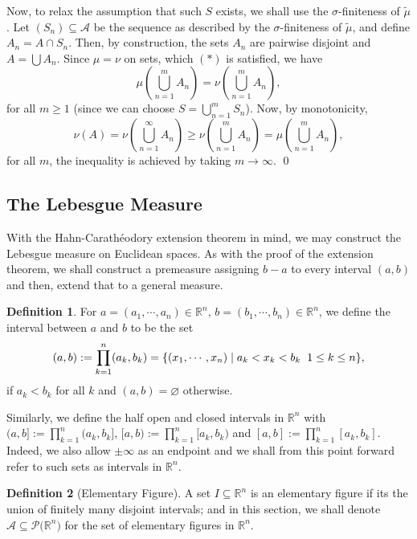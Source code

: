 \documentclass[
]{article}
\theoremstyle{definition}
\theoremstyle{definition}
\newtheorem{definition}{Definition}[section]
\begin{document}
Now, to relax the assumption that such \(S\) exists, we shall use the
\(\sigma\)-finiteness of \(\tilde{\mu}\). Let
\((S_n) \subseteq \mathcal{A}\) be the sequence as described by the
\(\sigma\)-finiteness of \(\tilde{\mu}\), and define
\(A_n = A \cap S_n\). Then, by construction, the sets \(A_n\) are
pairwise disjoint and \(A = \bigcup A_n\). Since \(\mu = \nu\) on sets,
which \((*)\) is satisfied, we have
\[\mu\left(\bigcup_{n = 1}^m A_n\right) = \nu\left(\bigcup_{n = 1}^m A_n\right),\]
for all \(m \ge 1\) (since we can choose \(S = \bigcup_{n = 1}^m S_n\)).
Now, by monotonicity,
\[\nu(A) = \nu\left(\bigcup_{n = 1}^\infty A_n\right) \ge \nu\left(\bigcup_{n = 1}^m A_n\right)
    = \mu\left(\bigcup_{n = 1}^m A_n\right),\] for all \(m\), the
inequality is achieved by taking \(m \to \infty\). \qed

\hypertarget{the-lebesgue-measure}{%
\subsection{The Lebesgue Measure}\label{the-lebesgue-measure}}

With the Hahn-Carathéodory extension theorem in mind, we may construct
the Lebesgue measure on Euclidean spaces. As with the proof of the
extension theorem, we shall construct a premeasure assigning \(b - a\)
to every interval \((a, b)\) and then, extend that to a general measure.

\begin{definition}
  For \(a = (a_1, \cdots, a_n) \in \mathbb{R}^n\), \(b = (b_1, \cdots, b_n) \in \mathbb{R}^n\),
  we define the interval between \(a\) and \(b\) to be the set 
  \[(a, b) := \prod_{k = 1}^n(a_k, b_k) = 
    \{(x_1, \cdots, x_n) \mid a_k < x_k < b_k \hspace{2mm} 1 \le k \le n \},\]
  if \(a_k < b_k\) for all \(k\) and \((a, b) = \varnothing\) otherwise.
\end{definition}

Similarly, we define the half open and closed intervals in
\(\mathbb{R}^n\) with \((a, b] := \prod_{k = 1}^n(a_k, b_k]\),
\([a, b) := \prod_{k = 1}^n[a_k, b_k)\) and
\([a, b] := \prod_{k = 1}^n[a_k, b_k]\). Indeed, we also allow
\(\pm \infty\) as an endpoint and we shall from this point forward refer
to such sets as intervals in \(\mathbb{R}^n\).

\begin{definition}[Elementary Figure]
  A set \(I \subseteq \mathbb{R}^n\) is an elementary figure if its the union 
  of finitely many disjoint intervals; and in this section, we shall denote 
  \(\mathcal{A} \subseteq \mathcal{P(}\mathbb{R}^n)\) for the set of elementary 
  figures in \(\mathbb{R}^n\).
\end{definition}
\end{document}
